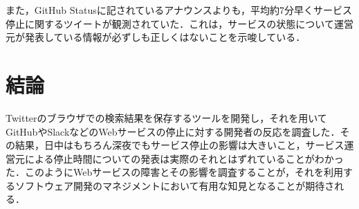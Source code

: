 \documentclass[uplatex,twocolumn,dvipdfmx]{jsarticle}
\begin{document}
また，GitHub Statusに記されているアナウンスよりも，平均約7分早くサービス停止に関するツイートが観測されていた．これは，サービスの状態について運営元が発表している情報が必ずしも正しくはないことを示唆している．

\section{結論}

Twitterのブラウザでの検索結果を保存するツールを開発し，それを用いてGitHubやSlackなどのWebサービスの停止に対する開発者の反応を調査した．その結果，日中はもちろん深夜でもサービス停止の影響は大きいこと，サービス運営元による停止時間についての発表は実際のそれとはずれていることがわかった．このようにWebサービスの障害とその影響を調査することが，それを利用するソフトウェア開発のマネジメントにおいて有用な知見となることが期待される．


\end{document}
